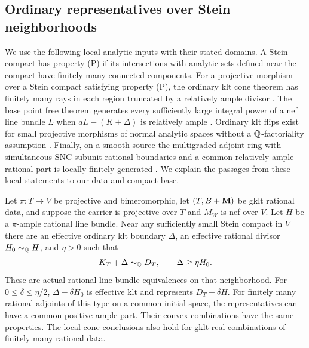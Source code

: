 \subsection{Ordinary representatives over Stein neighborhoods}

We use the following local analytic inputs with their stated domains.
A Stein compact has property \textup{(P)} if its intersections with
analytic sets defined near the compact have finitely many connected
components.
For a projective morphism over a Stein compact satisfying property
\textup{(P)}, the ordinary klt cone theorem has finitely many rays in
each region truncated by a relatively ample divisor
\cite[Theorem~7.2]{Fujino2022}.  The base point free theorem generates
every sufficiently large integral power of a nef line bundle $L$ when
$aL-(K+\Delta)$ is relatively ample
\cite[Theorems~6.2 and~6.5]{Fujino2022}.  Ordinary klt flips exist for
small projective morphisms of normal analytic spaces without a
$\mathbb Q$-factoriality assumption \cite[Theorem~1.14]{Fujino2022}.  Finally, on
a smooth source the multigraded adjoint ring with simultaneous SNC
subunit rational boundaries and a common relatively ample rational
part is locally finitely generated
\cite[Theorem~3.1]{DHP2024}.  We explain the passages from these local
statements to our data and compact base.

\begin{lemma}\label{lem:ordinary-representative}
Let $\pi\colon T\to V$ be projective and bimeromorphic, let
$(T,B+\mathbf M)$ be gklt rational data, and suppose the carrier is
projective over $T$ and $M_W$ is nef over $V$.  Let $H$ be a
$\pi$-ample rational line bundle.  Near any sufficiently small Stein
compact in $V$ there are an effective ordinary klt boundary $\Delta$,
an effective rational divisor $H_0\sim_{\mathbb Q} H$, and $\eta>0$ such that
\begin{equation}\label{eq:ordinary-replacement}
 K_T+\Delta\sim_{\mathbb Q} D_T,\qquad \Delta\geq\eta H_0.
\end{equation}
These are actual rational line-bundle equivalences on that
neighborhood.  For $0\leq\delta\leq\eta/2$,
$\Delta-\delta H_0$ is effective klt and represents $D_T-\delta H$.
For finitely many rational adjoints of this type on a common initial
space, the representatives can have a common positive ample part.
Their convex combinations have the same properties.  The local cone
conclusions also hold for gklt real combinations of finitely many
rational data.
\end{lemma}

